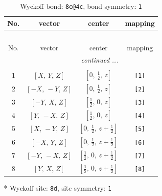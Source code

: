 \documentclass[fleqn,8pt]{jsarticle}
\begin{document}
\renewcommand{\arraystretch}{1.2}
\begin{longtable}{cccc}
\caption{Wyckoff bond: {\tt 8c@4c}, bond symmetry: {\tt 1}}
 \\
 \hline \hline
No. & vector & center & mapping \\ \hline \endfirsthead

\multicolumn{3}{l}{\tablename\ \thetable{}} \\
 \hline \hline
No. & vector & center & mapping \\ \hline \endhead

 \hline \hline
\multicolumn{3}{r}{\footnotesize\it continued ...} \\ \endfoot

 \hline \hline
\multicolumn{3}{r}{} \\ \endlastfoot

1 & $\left[ X,\, Y,\, Z \right]$ & $\left[ 0,\, \frac{1}{2},\, z \right]$ & {\tt [1]} \\ \hline
2 & $\left[ - X,\, - Y,\, Z \right]$ & $\left[ 0,\, \frac{1}{2},\, z \right]$ & {\tt [2]} \\ \hline
3 & $\left[ - Y,\, X,\, Z \right]$ & $\left[ \frac{1}{2},\, 0,\, z \right]$ & {\tt [3]} \\ \hline
4 & $\left[ Y,\, - X,\, Z \right]$ & $\left[ \frac{1}{2},\, 0,\, z \right]$ & {\tt [4]} \\ \hline
5 & $\left[ X,\, - Y,\, Z \right]$ & $\left[ 0,\, \frac{1}{2},\, z + \frac{1}{2} \right]$ & {\tt [5]} \\ \hline
6 & $\left[ - X,\, Y,\, Z \right]$ & $\left[ 0,\, \frac{1}{2},\, z + \frac{1}{2} \right]$ & {\tt [6]} \\ \hline
7 & $\left[ - Y,\, - X,\, Z \right]$ & $\left[ \frac{1}{2},\, 0,\, z + \frac{1}{2} \right]$ & {\tt [7]} \\ \hline
8 & $\left[ Y,\, X,\, Z \right]$ & $\left[ \frac{1}{2},\, 0,\, z + \frac{1}{2} \right]$ & {\tt [8]} \\
\end{longtable}
* Wyckoff site: {\tt 8d}, site symmetry: {\tt 1}
\renewcommand{\arraystretch}{1.2}
\end{document}
